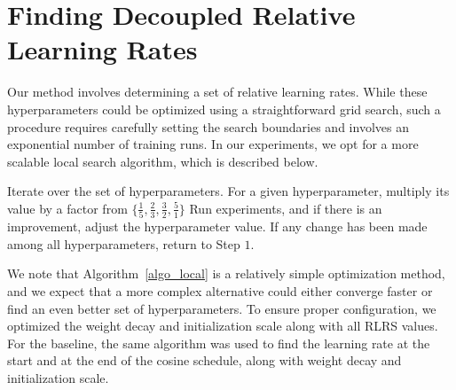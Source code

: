 \documentclass{article} %
\newcommand{\moe}[1]{$\text{MoE}_{8\times#1\text{M}}$}
\newcommand{\dense}[1]{$\text{Dense}_{#1\text{M}}$}
\newcommand{\ka}[1]{\textcolor{magenta}{[KA: #1]}}
\newcommand{\jmr}[2]{\textcolor{purple}{[JM:] \sout{#1} #2}}
\begin{document}
    \section{Finding Decoupled Relative Learning Rates} \label{app:local_search}


    Our method involves determining a set of relative learning rates. While these hyperparameters could be optimized using a straightforward grid search, such a procedure requires carefully setting the search boundaries and involves an exponential number of training runs. In our experiments, we opt for a more scalable local search algorithm, which is described below. 


    \begin{algorithm}
    \caption{Local Search}
    \begin{algorithmic}[1]
    \State Iterate over the set of hyperparameters.
    \State For a given hyperparameter, multiply its value by a factor from $\{\frac{1}{5}, \frac{2}{3}, \frac{3}{2}, \frac{5}{1}\}$
    \State Run experiments, and if there is an improvement, adjust the hyperparameter value.
    \State If any change has been made among all hyperparameters, return to Step $1$.
    \end{algorithmic}
    \label{algo_local}
    \end{algorithm}

    We note that Algorithm~\ref{algo_local} is a relatively simple optimization method, and we expect that a more complex alternative could either converge faster or find an even better set of hyperparameters. To ensure proper configuration, we optimized the weight decay and initialization scale along with all RLRS values. For the baseline, the same algorithm was used to find the learning rate at the start and at the end of the cosine schedule, along with weight decay and initialization scale. 
\end{document}

